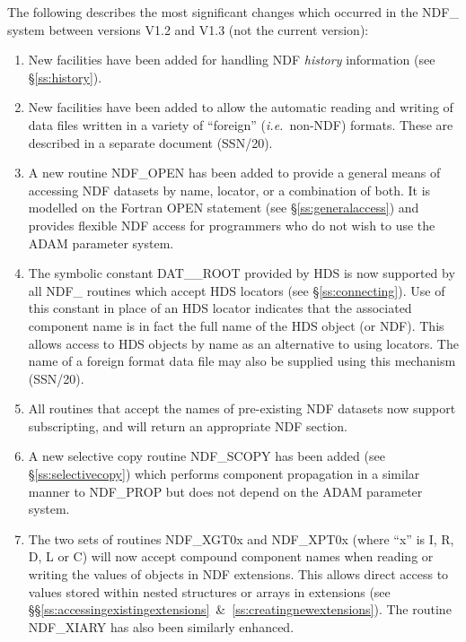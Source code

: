 \documentclass[twoside,11pt]{article}
\newcommand{\htmlref}[2]{#1}
\newcommand{\xref}[3]{#1}
\newcommand{\st}[1]{{\em{#1}}}
\begin{document}
The following describes the most significant changes which occurred in
the NDF\_ system between versions V1.2 and V1.3 (not the current
version):

\begin{enumerate}

\item New facilities have been added for handling NDF \st{history\/}
information (see \S\ref{ss:history}).

\item New facilities have been added to allow the automatic reading and writing
of data files written in a variety of ``foreign'' (\st{i.e.}\ non-NDF)
formats. These are described in a separate document
(\xref{SSN/20}{ssn20}{}).

\item A new routine \htmlref{NDF\_OPEN}{NDF_OPEN} has been added to provide a general
means of accessing NDF datasets by name,
\xref{locator}{sun92}{using_locators}, or a combination of
both. It is modelled on the Fortran OPEN statement (see
\S\ref{ss:generalaccess}) and provides flexible NDF access for
programmers who do not wish to use the \xref{ADAM}{sg4}{} parameter system.

\item The symbolic constant DAT\_\_ROOT provided by \xref{HDS}{sun92}{} is now
supported by all NDF\_ routines which accept \xref{HDS
locators}{sun92}{using_locators} (see
\S\ref{ss:connecting}). Use of this constant in place of an HDS
locator indicates that the associated component name is in fact the
full name of the HDS object (or NDF). This allows access to HDS
objects by name as an alternative to using locators. The name of a
foreign format data file may also be supplied using this mechanism
(\xref{SSN/20}{ssn20}{}).

\item All routines that accept the names of pre-existing NDF datasets now
support subscripting, and will return an appropriate NDF section.

\item A new selective copy routine \htmlref{NDF\_SCOPY}{NDF_SCOPY} has been added (see
\S\ref{ss:selectivecopy}) which performs component propagation in a
similar manner to \htmlref{NDF\_PROP}{NDF_PROP} but does not depend on the
\xref{ADAM}{sg4}{} parameter system.

\item The two sets of routines \htmlref{NDF\_XGT0x}{NDF_XGT0x} and \htmlref{NDF\_XPT0x}{NDF_XPT0x} (where ``x''
is I, R, D, L or C) will now accept compound component names when
reading or writing the values of objects in NDF extensions. This
allows direct access to values stored within nested structures or
arrays in extensions (see
\S\S\ref{ss:accessingexistingextensions}~\&~\ref{ss:creatingnewextensions}).
The routine \htmlref{NDF\_XIARY}{NDF_XIARY} has also been similarly enhanced.


\end{enumerate}
\end{document}

